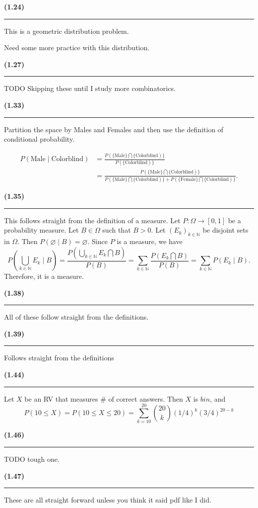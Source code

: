 \documentclass[12pt, reqno]{amsart}
\numberwithin{equation}{section}
\newcommand{\N}{\mathbb{N}}
\let\emptyset\varnothing
\newcommand{\intersect}{\bigcap}
\newcommand{\union}{\bigcup}
\newcommand{\given}{\mid}
\begin{document}
{\bf (1.24)\rule{\textwidth}{.5pt}}

This is a geometric distribution problem.

Need some more practice with this distribution.

{\bf (1.27)\rule{\textwidth}{.5pt}}

TODO Skipping these until I study more combinatorics.

{\bf (1.33)\rule{\textwidth}{.5pt}}

Partition the space by Males and Females and then use the definition of conditional probability.

\begin{align*}
P(\text{Male} \given \text{Colorblind})
&= \frac{P( \{ \text{Male} \} \intersect \{ \text{Colorblind}) \} }{ P( \{ \text{Colorblind}) \} } \\
&= \frac{P( \{ \text{Male} \} \intersect \{ \text{Colorblind}) \} }{ P( \{ \text{Male} \} \intersect \{ \text{Colorblind}) \} + P( \{ \text{Female} \} \intersect \{ \text{Colorblind}) \}}.
\end{align*}

{\bf (1.35) \rule{\textwidth}{.5pt}}

This follows straight from the definition of a measure.
Let $P : \Omega \to [0, 1]$ be a probability measure.
Let $B \in \Omega$ such that $B > 0.$
Let $(E_k)_{k \in \N}$ be disjoint sets in $\Omega.$
Then
$P(\emptyset \given B) = \emptyset$.
Since $P$ is a measure, we have
\[
P(\union_{k \in \N} E_k \given B)
= \frac{P(\union_{k \in \N} E_k \intersect B)}{P(B)}
= \sum_{k \in \N}  \frac{P(E_k \intersect B)}{P(B)}
=\sum_{k \in \N}  P(E_k \given B).
\]
Therefore, it is a measure.

{\bf (1.38) \rule{\textwidth}{.5pt}}

All of these follow straight from the definitions.

{\bf (1.39) \rule{\textwidth}{.5pt}}

Follows straight from the definitions

{\bf (1.44) \rule{\textwidth}{.5pt}}

Let $X$ be an RV that measures \# of correct answers. Then $X$ is $bin$, and
\[
P(10 \le X)
= P(10 \le X \le 20)
= \sum_{k = 10}^{20} \binom{20}{k} (1/4)^{k} (3/4)^{20 - k}
\]

{\bf (1.46) \rule{\textwidth}{.5pt}}

TODO tough one.

{\bf (1.47) \rule{\textwidth}{.5pt}}

These are all straight forward unless you think it said pdf like I did.
\end{document}
